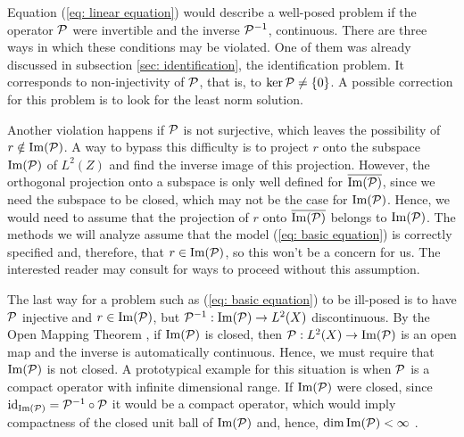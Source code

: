 
Equation (\ref{eq: linear equation}) would describe a well-posed problem if the operator $ \mathcal{P} $ were invertible and the inverse $ \mathcal{P}^{ -1 } $, continuous.
There are three ways in which these conditions may be violated.
One of them was already discussed in subsection \ref{sec: identification}, the identification problem.
It corresponds to non-injectivity of $ \mathcal{P} $, that is, to $ \ker \mathcal{P} \neq \left\{ 0 \right\} $.
A possible correction for this problem is to look for the least norm solution.

Another violation happens if $ \mathcal{P} $ is not surjective, which leaves the possibility of $ r \notin \operatorname{Im} ( \mathcal{P} ) $.
A way to bypass this difficulty is to project $ r $ onto the subspace $ \operatorname{Im} ( \mathcal{P} ) $ of $ L^{ 2 } ( Z ) $ and find the inverse image of this projection.
However, the orthogonal projection onto a subspace is only well defined for $ \overline{\operatorname{Im} ( \mathcal{P} )} $, since we need the subspace to be closed, which may not be the case for $ \operatorname{Im} ( \mathcal{P} ) $.
Hence, we would need to assume that the projection of $ r $ onto $ \overline{\operatorname{Im} ( \mathcal{P} )} $ belongs to $ \operatorname{Im} ( \mathcal{P} ) $.
The methods we will analyze assume that the model (\ref{eq: basic equation}) is correctly specified and, therefore, that $ r \in \operatorname{Im} ( \mathcal{P} ) $, so this won't be a concern for us.
The interested reader may consult \cite{florens2007} for ways to proceed without this assumption.

The last way for a problem such as (\ref{eq: basic equation}) to be ill-posed is to have $ \mathcal{P} $ injective and $ r \in \operatorname{Im} ( \mathcal{P} ) $, but $ \mathcal{P}^{ -1 } : \operatorname{Im} ( \mathcal{P} ) \to L^{ 2 } ( X ) $ discontinuous.
By the Open Mapping Theorem \cite{rudin1991}, if $ \operatorname{Im} ( \mathcal{P} ) $ is closed, then $ \mathcal{P} : L^{ 2 } ( X ) \to \operatorname{Im} ( \mathcal{P} ) $ is an open map and the inverse is automatically continuous.
Hence, we must require that $ \operatorname{Im} ( \mathcal{P} ) $ is not closed.
A prototypical example for this situation is when $ \mathcal{P} $ is a compact operator with infinite dimensional range.
If $ \operatorname{Im} ( \mathcal{P} ) $ were closed, since $ \operatorname{id}_{ \operatorname{Im} ( \mathcal{P} ) } = \mathcal{P}^{ -1 } \circ \mathcal{P} $ it would be a compact operator, which would imply compactness of the closed unit ball of $ \operatorname{Im} ( \mathcal{P} ) $ and, hence, $ \dim \operatorname{Im} ( \mathcal{P} ) < \infty $ \cite{florens2007}.

